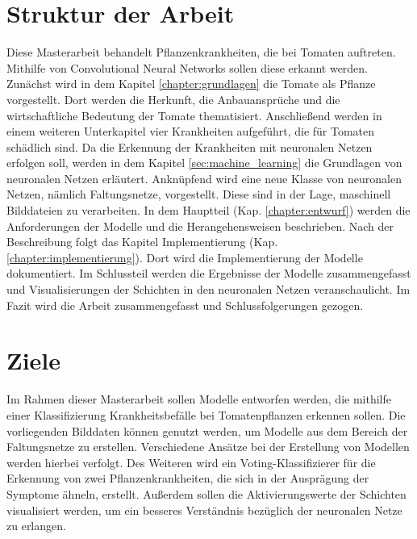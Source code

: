 \section{Struktur der Arbeit}


Diese Masterarbeit behandelt Pflanzenkrankheiten, die bei Tomaten auftreten. Mithilfe von Convolutional Neural Networks sollen diese erkannt werden. Zunächst wird in dem Kapitel \ref{chapter:grundlagen} die Tomate als Pflanze vorgestellt. Dort werden die Herkunft, die Anbauansprüche und die wirtschaftliche Bedeutung der Tomate thematisiert. Anschließend werden in einem weiteren Unterkapitel vier Krankheiten aufgeführt, die für Tomaten schädlich sind. Da die Erkennung der Krankheiten mit neuronalen Netzen erfolgen soll, werden in dem Kapitel \ref{sec:machine_learning} die Grundlagen von neuronalen Netzen erläutert. Anknüpfend wird eine neue Klasse von neuronalen Netzen, nämlich Faltungsnetze, vorgestellt. Diese sind in der Lage, maschinell Bilddateien zu verarbeiten. In dem Hauptteil (Kap. \ref{chapter:entwurf}) werden die Anforderungen der Modelle und die Herangehensweisen beschrieben. Nach der Beschreibung folgt das Kapitel Implementierung (Kap. \ref{chapter:implementierung}). Dort wird die Implementierung der Modelle dokumentiert. Im Schlussteil werden die Ergebnisse der Modelle zusammengefasst und Visualisierungen der Schichten in den neuronalen Netzen veranschaulicht. Im Fazit wird die Arbeit zusammengefasst und Schlussfolgerungen gezogen.


\section{Ziele}

Im Rahmen dieser Masterarbeit sollen Modelle entworfen werden, die mithilfe einer Klassifizierung Krankheitsbefälle bei Tomatenpflanzen erkennen sollen. Die vorliegenden Bilddaten können genutzt werden, um Modelle aus dem Bereich der Faltungsnetze zu erstellen. Verschiedene Ansätze bei der Erstellung von Modellen werden hierbei verfolgt. Des Weiteren wird ein Voting-Klassifizierer für die Erkennung von zwei Pflanzenkrankheiten, die sich in der Ausprägung der Symptome ähneln, erstellt. Außerdem sollen die Aktivierungswerte der Schichten visualisiert werden, um ein besseres Verständnis bezüglich der neuronalen Netze zu erlangen.

